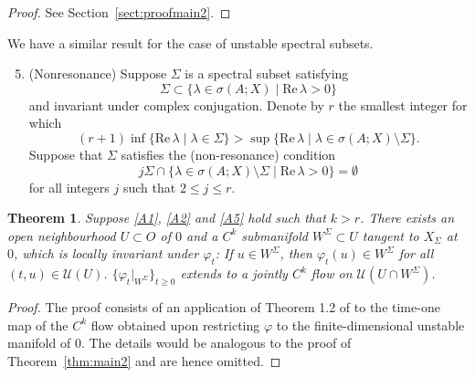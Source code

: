 \documentclass[a4paper, 12pt, oneside, reqno, notitlepage]{amsart}
\theoremstyle{plain}
\newtheorem{theorem}{Theorem}
\theoremstyle{definition}
\theoremstyle{remark}
\begin{document}
\begin{proof}
    See Section~\ref{sect:proofmain2}.
\end{proof}

We have a similar result for the case of unstable spectral subsets.


\begin{enumerate}[label =(A.\arabic*)]
    \setcounter{enumi}{4}
    \item \label{A5} (Nonresonance) Suppose $\Sigma$ is a spectral subset satisfying
    \begin{displaymath}
         \Sigma \subset \{ \lambda \in \sigma(A;X) \; | \; \mathrm{Re} \, \lambda > 0 \}
    \end{displaymath}
    and invariant under complex conjugation. 
    Denote by $r$ the smallest integer for which 
    \begin{displaymath}
          (r+1) \inf \{ \mathrm{Re} \, \lambda \; | \; \lambda \in  {\Sigma} \} >  \sup \{ \mathrm{Re} \, \lambda \; | \; \lambda \in \sigma(A;X) \setminus \Sigma \}.
    \end{displaymath}
    Suppose that $\Sigma$ satisfies the (non-resonance) condition
    \begin{displaymath}
   j \Sigma \cap \{  \lambda \in \sigma(A;X) \setminus \Sigma \; | \;  \mathrm{Re} \, \lambda > 0 \} = \emptyset
    \end{displaymath}
    for all integers $j$ such that $2 \leq j \leq r$.
\end{enumerate}

\begin{theorem} \label{thm:main3}
    Suppose \ref{A1}, \ref{A2} and \ref{A5} hold such that $k > r$.
    There exists an open neighbourhood $U \subset O$ of $0$ and a $C^k$ submanifold $W^\Sigma \subset U$ tangent to $X_\Sigma$ at $0$, which is locally invariant under $\varphi_t$: If $u \in W^\Sigma$, then $\varphi_t(u) \in W^\Sigma$ for all $(t,u) \in \mathcal{U}(U)$.
    $\{\varphi_t|_{W^\Sigma} \}_{t \geq 0}$ extends to a jointly $C^k$ flow on $\mathcal{U}(U \cap W^\Sigma)$. 
\end{theorem}

\begin{proof}
    The proof consists of an application of Theorem 1.2 of \cite{Cabre2003a} to the time-one map of the $C^k$ flow obtained upon restricting $\varphi$ to the finite-dimensional unstable manifold of $0$.
    The details would be analogous to the proof of Theorem~\ref{thm:main2} and are hence omitted.
\end{proof}
\end{document}
